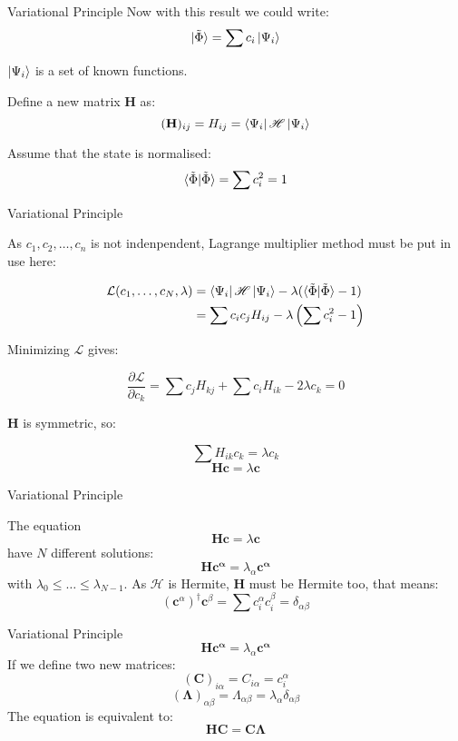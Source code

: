 \documentclass[aspectratio=169,10pt,compress,t]{ctexbeamer}
\begin{document}
\begin{frame}{Variational Principle}
Now with this result we could write:
$$\ket{\tilde{\Phi}} = \sum c_i \ket{\Psi_i} $$

{$\ket{\Psi_i}$} is a set of known functions.

Define a new matrix $\mathbf{H}$ as:
$$ (\mathbf{H})_{ij} = H_{ij} = \Bra{\Psi_i} \mathscr{H} \Ket{\Psi_i} $$

Assume that the state is normalised:
$$ \braket{\tilde{\Phi} | \tilde{\Phi}} = \sum c_i^2 = 1$$

\end{frame}

\begin{frame}{Variational Principle}

As $c_1, c_2, \dots, c_n$ is not indenpendent, Lagrange multiplier method
must be put in use here:

\begin{equation*}
\begin{aligned}
\mathcal{L}(c_1, \dots, c_N, \lambda)  &= \Bra{\Psi_i} \mathscr{H} \Ket{\Psi_i} - \lambda( \braket{\tilde{\Phi} | \tilde{\Phi}} - 1) \\
&= \sum c_i c_j H_{ij} - \lambda \left( \sum c_i^2 - 1 \right)
\end{aligned}
\end{equation*}

Minimizing $\mathcal{L}$ gives:

$$\frac{\partial \mathcal{L}}{\partial c_k} = \sum c_j H_{kj} + \sum c_i H_{ik} - 2 \lambda c_k = 0$$

$\mathbf{H}$ is symmetric, so:

$$\sum H_{ik} c_k = \lambda c_k$$
$$\mathbf{H} \mathbf{c} = \lambda \mathbf{c}$$

\end{frame}

\begin{frame}{Variational Principle}

The equation
$$\mathbf{H} \mathbf{c} = \lambda \mathbf{c}$$
have $N$ different solutions:
$$\mathbf{H} \mathbf{c^\alpha} = \lambda_\alpha \mathbf{c^\alpha}$$
with $\lambda_0 \leq \dots \leq \lambda_{N-1}$.
As $\mathscr{H}$ is Hermite, $\mathbf{H}$ must be Hermite too, that means:
$$(\mathbf{c}^\alpha)^\dagger \mathbf{c}^\beta = \sum c_i^\alpha c_i^\beta = \delta_{\alpha \beta}$$

\end{frame}

\begin{frame}{Variational Principle}
$$\mathbf{H} \mathbf{c^\alpha} = \lambda_\alpha \mathbf{c^\alpha}$$
If we define two new matrices:
$$(\mathbf{C})_{i\alpha} = C_{i\alpha} = c_i^\alpha$$
$$(\boldsymbol{\Lambda})_{\alpha \beta} = \Lambda_{\alpha \beta} = \lambda_\alpha \delta_{\alpha \beta}$$
The equation is equivalent to:
$$\mathbf{HC}=\mathbf{C}\boldsymbol{\Lambda}$$
\end{frame}
\end{document}
